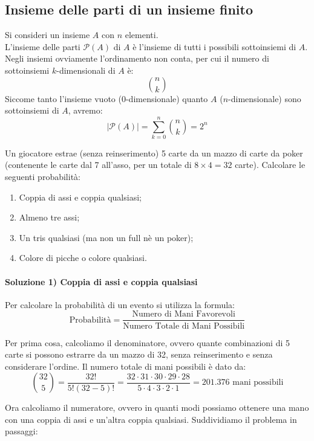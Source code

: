 \subsection{Insieme delle parti di un insieme finito}

Si consideri un insieme $A$ con $n$ elementi.
\\L'insieme delle parti $\mathcal{P}(A)$ di $A$ è l'insieme di tutti i possibili sottoinsiemi di $A$.
Negli insiemi ovviamente l'ordinamento non conta, per cui il numero di sottoinsiemi $k$-dimensionali di $A$ è:
    \[ \binom{n}{k} \]
Siccome tanto l'insieme vuoto ($0$-dimensionale) quanto $A$ ($n$-dimensionale) sono sottoinsiemi di $A$, avremo:
    \[ |\mathcal{P}(A)| = \sum_{k=0}^{n} \binom{n}{k} = 2^n \]

\begin{esempio}
Un giocatore estrae (senza reinserimento) 5 carte da un mazzo di carte da poker (contenente le carte dal 7 all’asso, per un totale di $8 \times 4 = 32$ carte).
Calcolare le seguenti probabilità:
\begin{enumerate}
    \item Coppia di assi e coppia qualsiasi;
    \item Almeno tre assi;
    \item Un tris qualsiasi (ma non un full nè un poker);
    \item Colore di picche o colore qualsiasi.
\end{enumerate}

\paragraph{Soluzione 1) Coppia di assi e coppia qualsiasi}

Per calcolare la probabilità di un evento si utilizza la formula:
\[
\text{Probabilità} = \frac{\text{Numero di Mani Favorevoli}}{\text{Numero Totale di Mani Possibili}}
\]

Per prima cosa, calcoliamo il denominatore, ovvero quante combinazioni di 5 carte si possono estrarre da un mazzo di 32, senza reinserimento e senza considerare l'ordine. Il numero totale di mani possibili è dato da:
\[
\binom{32}{5} = \frac{32!}{5!(32-5)!} = \frac{32 \cdot 31 \cdot 30 \cdot 29 \cdot 28}{5 \cdot 4 \cdot 3 \cdot 2 \cdot 1} = \mathbf{201.376} \text{ mani possibili}
\]

Ora calcoliamo il numeratore, ovvero in quanti modi possiamo ottenere una mano con una coppia di assi e un'altra coppia qualsiasi. Suddividiamo il problema in passaggi:


\end{esempio}
